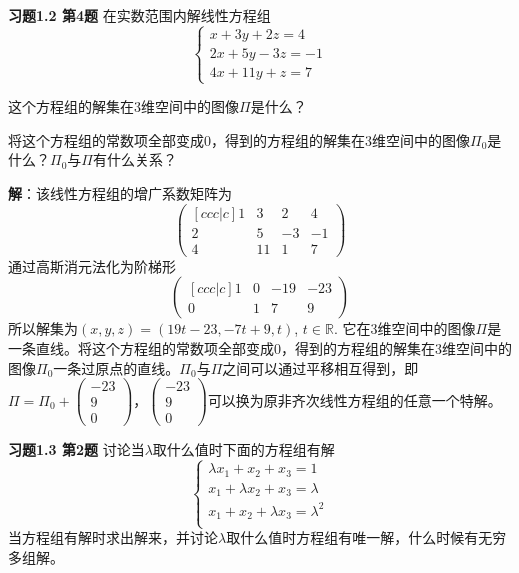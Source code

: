 \vspace{2em}

{\bf 习题1.2 第4题} 在实数范围内解线性方程组
$$\begin{cases}
x + 3y + 2z = 4 \\
2x + 5y -3z = -1 \\
4x + 11y + z = 7
\end{cases}$$

这个方程组的解集在3维空间中的图像$\Pi$是什么？

将这个方程组的常数项全部变成0，得到的方程组的解集在3维空间中的图像$\Pi_0$是什么？$\Pi_0$与$\Pi$有什么关系？

{\bf 解}：该线性方程组的增广系数矩阵为
$$\begin{pmatrix}[ccc|c]
  1 & 3 & 2 & 4\\
  2 & 5 & -3 & -1 \\
  4 & 11 & 1 & 7
\end{pmatrix}$$
通过高斯消元法化为阶梯形
$$\begin{pmatrix}[ccc|c]
  1 & 0 & -19 & -23\\
  0 & 1 & 7 & 9
\end{pmatrix}$$
所以解集为$(x,y,z) = (19t-23,-7t+9,t)$, $t\in\mathbb{R}$. 它在3维空间中的图像$\Pi$是一条直线。将这个方程组的常数项全部变成0，得到的方程组的解集在3维空间中的图像$\Pi_0$一条过原点的直线。$\Pi_0$与$\Pi$之间可以通过平移相互得到，即$\Pi = \Pi_0 + \begin{pmatrix} -23 \\ 9 \\ 0 \end{pmatrix}$，$\begin{pmatrix} -23 \\ 9 \\ 0 \end{pmatrix}$可以换为原非齐次线性方程组的任意一个特解。

\vspace{2em}

{\bf 习题1.3 第2题} 讨论当$\lambda$取什么值时下面的方程组有解
$$\begin{cases}
\lambda x_1 + x_2 + x_3 = 1 \\
x_1 + \lambda x_2 + x_3 = \lambda \\
x_1 + x_2 + \lambda x_3 = \lambda^2 \\
\end{cases}$$
当方程组有解时求出解来，并讨论$\lambda$取什么值时方程组有唯一解，什么时候有无穷多组解。

